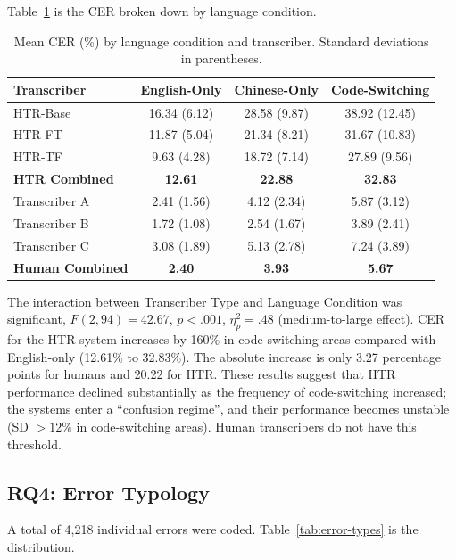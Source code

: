 \documentclass[final]{anthology-ch} %
\begin{document}
Table~\ref{tab:cer-language} is the CER broken down by language condition.

\begin{table}[h]
  \centering
  \small
  \begin{tabular}{lccc}
    \toprule
    Transcriber & English-Only & Chinese-Only & Code-Switching \\
    \midrule
    HTR-Base           & 16.34 (6.12) & 28.58 (9.87) & 38.92 (12.45) \\
    HTR-FT             & 11.87 (5.04) & 21.34 (8.21) & 31.67 (10.83) \\
    HTR-TF             & 9.63 (4.28)  & 18.72 (7.14) & 27.89 (9.56) \\
    \textbf{HTR Combined}   & \textbf{12.61} & \textbf{22.88} & \textbf{32.83} \\
    Transcriber A      & 2.41 (1.56)  & 4.12 (2.34)  & 5.87 (3.12) \\
    Transcriber B      & 1.72 (1.08)  & 2.54 (1.67)  & 3.89 (2.41) \\
    Transcriber C      & 3.08 (1.89)  & 5.13 (2.78)  & 7.24 (3.89) \\
    \textbf{Human Combined} & \textbf{2.40} & \textbf{3.93} & \textbf{5.67} \\
    \bottomrule
  \end{tabular}
  \caption{Mean CER (\%) by language condition and transcriber. Standard deviations in parentheses.}
  \label{tab:cer-language}
\end{table}

The interaction between Transcriber Type and Language Condition was significant, $F(2, 94) = 42.67$, $p < .001$, $\eta^2_p = .48$ (medium-to-large effect). CER for the HTR system increases by 160\% in code-switching areas compared with English-only (12.61\% to 32.83\%). The absolute increase is only 3.27 percentage points for humans and 20.22 for HTR. These results suggest that HTR performance declined substantially as the frequency of code-switching increased; the systems enter a \enquote{confusion regime}, and their performance becomes unstable (SD $> 12\%$ in code-switching areas). Human transcribers do not have this threshold.

\subsection{RQ4: Error Typology}

A total of 4,218 individual errors were coded. Table~\ref{tab:error-types} is the distribution.
\end{document}

